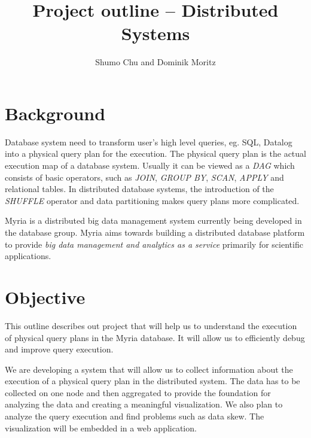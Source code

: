 \documentclass[11pt]{article}
\begin{document}

\title{Project outline \--- Distributed Systems}
\author{Shumo Chu and Dominik Moritz}
\date{}

\maketitle

\section{Background}

Database system need to transform user's high level queries, eg. SQL, Datalog into a physical query plan for the execution. The physical query plan is the actual execution map of a database system. Usually it can be viewed as a \emph{DAG} which consists of basic operators, such as \emph{JOIN}, \emph{GROUP BY}, \emph{SCAN}, \emph{APPLY} and relational tables. In distributed database systems, the introduction of the \emph{SHUFFLE} operator and data partitioning makes query plans more complicated.

Myria is a distributed big data management system currently being developed in the database group. Myria aims towards building a distributed database platform to provide \emph{big data management and analytics as a service} primarily for scientific applications.

\section{Objective}
\label{sec:objective}

This outline describes out project that will help us to understand the execution of physical query plans in the Myria database. It will allow us to efficiently debug and improve query execution.

We are developing a system that will allow us to collect information about the execution of a physical query plan in the distributed system. The data has to be collected on one node and then aggregated to provide the foundation for analyzing the data and creating a meaningful visualization. We also plan to analyze the query execution and find problems such as data skew. The visualization will be embedded in a web application.

\vspace{10px}
\end{document}
